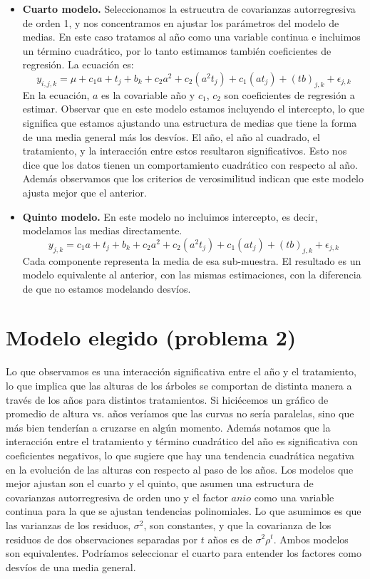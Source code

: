 \documentclass[a4paper,10pt]{article}
\begin{document}
\begin{itemize}
  \item \textbf{Cuarto modelo.} Seleccionamos la estrucutra de covarianzas autorregresiva de orden 1, y nos concentramos en ajustar los parámetros del 
  modelo de medias. En este caso tratamos al año como una variable continua e incluimos un término cuadrático, por lo tanto estimamos también coeficientes
  de regresión. La ecuación es:
  \begin{equation*}
   y_{i,j,k} = \mu + c_1 a + t_j + b_k + c_2 a^2 + c_2 (a^2 t_j) + c_1 (at_j) + (tb)_{j,k} + \epsilon_{j,k}
  \end{equation*}
  En la ecuación, $a$ es la covariable año y $c_1$, $c_2$ son coeficientes de regresión a estimar.
  Observar que en este modelo estamos incluyendo el intercepto, lo que significa que estamos ajustando una estructura de medias que tiene la forma de una
  media general más los desvíos. El año, el año al cuadrado, el tratamiento, y la interacción entre estos resultaron significativos. Esto nos dice que 
  los datos tienen un comportamiento cuadrático con respecto al año.
  Además observamos que los criterios de verosimilitud indican que este modelo ajusta mejor que el anterior.
  
  \item \textbf{Quinto modelo.} En este modelo no incluimos intercepto, es decir, modelamos las medias directamente. 
  \begin{equation*}
   y_{j,k} = c_1 a + t_j + b_k + c_2 a^2 + c_2 (a^2 t_j) + c_1 (at_j) + (tb)_{j,k} + \epsilon_{j,k}
  \end{equation*}
  Cada componente representa la media de esa sub-muestra.
  El resultado es un modelo equivalente al anterior, con las mismas estimaciones, con la diferencia de que no estamos modelando desvíos.
\end{itemize}



\section{Modelo elegido (problema 2)}

Lo que observamos es una interacción significativa entre el año y el tratamiento, lo que implica que las alturas de los árboles se comportan de distinta
manera a través de los años para distintos tratamientos. Si hiciécemos un gráfico de promedio de altura vs. años veríamos que las curvas no sería 
paralelas, sino que más bien tenderían a cruzarse en algún momento. Además notamos que la interacción entre el tratamiento y término cuadrático del año es
significativa con coeficientes negativos, lo que sugiere que hay una tendencia cuadrática negativa en la evolución de las alturas con respecto al paso de
los años.
Los modelos que mejor ajustan son el cuarto y el quinto, que asumen una estructura de covarianzas autorregresiva de orden uno y el factor $anio$ como una variable 
continua para la que se ajustan tendencias polinomiales. Lo que asumimos es que las varianzas de los residuos, $\sigma^2$, son constantes, y que la covarianza
de los residuos de dos observaciones separadas por $t$ años es de $\sigma^2 \rho^t$.
Ambos modelos son equivalentes. Podríamos seleccionar el cuarto para entender los factores como desvíos de una media general.
\end{document}
